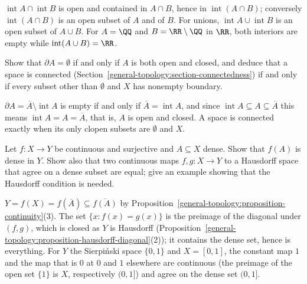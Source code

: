 \begin{solution}
$\operatorname{int}A \cap \operatorname{int}B$ is open and contained in $A \cap B$, hence in $\operatorname{int}(A \cap B)$; conversely $\operatorname{int}(A \cap B)$ is an open subset of $A$ and of $B$. For
unions, $\operatorname{int}A \cup \operatorname{int}B$ is an open subset of $A \cup B$. For $A = \QQ$ and $B = \RR \setminus \QQ$ in $\RR$, both interiors are empty while $\operatorname{int}(A \cup B) = \RR$.
\end{solution}

\begin{exercise}\label{general-topology:exercise-boundary-clopen}
Show that $\partial A = \emptyset$ if and only if $A$ is both open and closed, and deduce that a space is connected (Section~\ref{general-topology:section-connectedness}) if and only if every subset other
than $\emptyset$ and $X$ has nonempty boundary.
\end{exercise}

\begin{solution}
$\partial A = \overline{A} \setminus \operatorname{int}A$ is empty if and only if $\overline{A} = \operatorname{int}A$, and since $\operatorname{int}A \subseteq A \subseteq \overline{A}$ this means
$\operatorname{int}A = A = \overline{A}$, that is, $A$ is open and closed. A space is connected exactly when its only clopen subsets are $\emptyset$ and $X$.
\end{solution}

\begin{exercise}\label{general-topology:exercise-dense-image}
Let $f \colon X \to Y$ be continuous and surjective and $A \subseteq X$ dense. Show that $f(A)$ is dense in $Y$. Show also that two continuous maps $f, g \colon X \to Y$ to a Hausdorff space that agree on a
dense subset are equal; give an example showing that the Hausdorff condition is needed.
\end{exercise}

\begin{solution}
$Y = f(X) = f(\overline{A}) \subseteq \overline{f(A)}$ by Proposition~\ref{general-topology:proposition-continuity}(3). The set $\{x : f(x) = g(x)\}$ is the preimage of the diagonal under $(f, g)$, which is
closed as $Y$ is Hausdorff (Proposition~\ref{general-topology:proposition-hausdorff-diagonal}(2)); it contains the dense set, hence is everything. For $Y$ the Sierpi\'nski space $\{0, 1\}$ and $X = [0, 1]$, the
constant map $1$ and the map that is $0$ at $0$ and $1$ elsewhere are continuous (the preimage of the open set $\{1\}$ is $X$, respectively $(0, 1]$) and agree on the dense set $(0, 1]$.
\end{solution}

